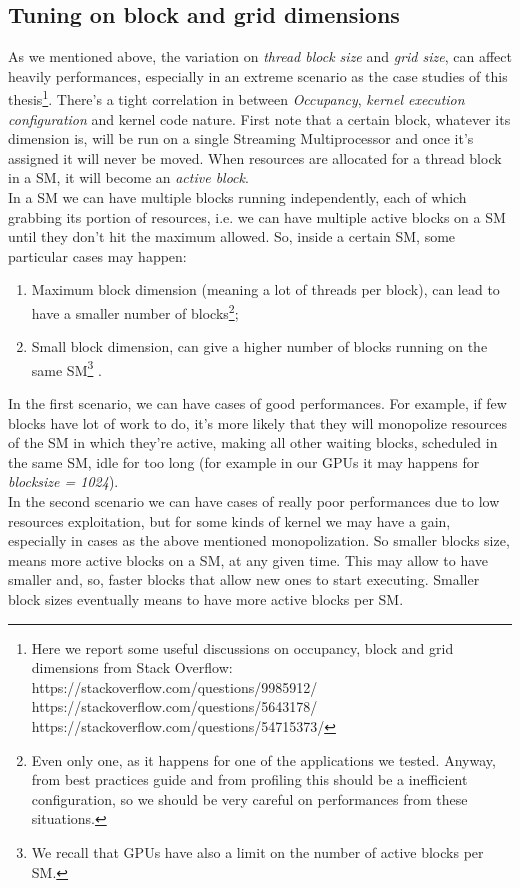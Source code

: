 			 
\subsection{Tuning on block and grid dimensions}
	As we mentioned above, the variation on \textit{thread block size} and \textit{grid size}, can affect heavily performances, especially in an extreme scenario as the case studies of this thesis\footnote{Here we report some useful discussions on occupancy, block and grid dimensions from Stack Overflow:\\
		https://stackoverflow.com/questions/9985912/\\
		https://stackoverflow.com/questions/5643178/\\
		https://stackoverflow.com/questions/54715373/ }.
	There's a tight correlation in between \textit{Occupancy}, \textit{kernel execution configuration} and kernel code nature.
	First note that a certain block, whatever its dimension is, will be run on a single Streaming Multiprocessor and once it's assigned it will never be moved. When resources are allocated for a thread block in a SM, it will become an \textit{active block}.\\
	In a SM we can have multiple blocks running independently, each of which grabbing its portion of resources, i.e. we can have multiple active blocks on a SM until they don't hit the maximum allowed\cite{perfoptimize,cudaguide}.
	So, inside a certain SM, some particular cases may happen:
	\begin{enumerate}
		\item Maximum block dimension (meaning a lot of threads per block), can lead to have a smaller number of blocks\footnote{Even only one, as it happens for one of the applications we tested. Anyway, from best practices guide and from profiling this should be a inefficient configuration, so we should be very careful on performances from these situations.};
		\item Small block dimension, can give a higher number of blocks running on the same SM\footnote{We recall that GPUs have also a limit on the number of active blocks per SM.} .
	\end{enumerate}
	
	In the first scenario, we can have cases of good performances.
	For example, if few blocks have lot of work to do, it's more likely that they will monopolize resources of the SM in which they're active, making all other waiting blocks, scheduled in the same SM, idle for too long (for example in our GPUs it may happens for \textit{blocksize = 1024}). \\
	In the second scenario we can have cases of really poor performances due to low resources exploitation, but for some kinds of kernel we may have a gain, especially in cases as the above mentioned monopolization. So smaller blocks size, means more active blocks on a SM, at any given time. This may allow to have smaller and, so, faster blocks that allow new ones to start executing. Smaller block sizes eventually means to have more active blocks per SM\cite{cudabestpractices}.
	
